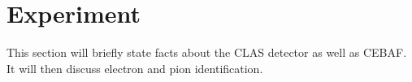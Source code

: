 \section{Experiment}

This section will briefly state facts about the CLAS detector as well as CEBAF.  It will then discuss electron and pion identification.